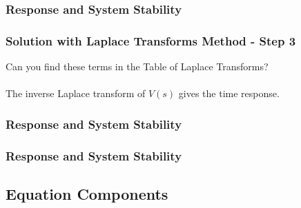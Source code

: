 \documentclass[fleqn]{beamer} %
\newcommand{\sectionIsubsectionIIItitle}{Response and System Stability}
\newcommand{\sectionIsubsectionIVtitle}{Equation Components}
\begin{document}
			\begin{frame} 
				\frametitle{\sectionIsubsectionIIItitle}
				\bigskip

				\frametitle{Solution with Laplace Transforms Method - Step 3}

				Can you find these terms in the Table of Laplace Transforms? \vspace{5mm}\\
				  \vspace{5mm} \\

				The inverse Laplace transform of $V(s)$ gives the time response. \vspace{5mm}\\

					

			
				\btVFill
			\end{frame}	


			\begin{frame} 
				\frametitle{\sectionIsubsectionIIItitle}
				\bigskip

			
				\btVFill
			\end{frame}	


			\begin{frame} 
				\frametitle{\sectionIsubsectionIIItitle}
				\bigskip

			
				\btVFill
			\end{frame}	

		\subsection{\sectionIsubsectionIVtitle}\label{sectionIsubsectionIV}
\end{document}
